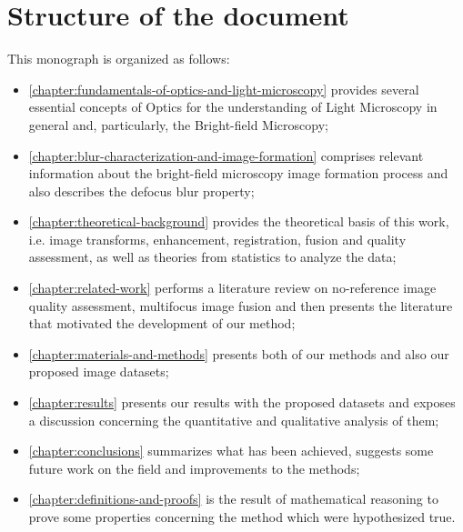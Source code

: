 \section*{Structure of the document}

This monograph is organized as follows:

\begin{itemize}
    \item \autoref{chapter:fundamentals-of-optics-and-light-microscopy} provides several essential concepts of Optics for the understanding of Light Microscopy in general and, particularly, the Bright-field Microscopy;
    
    \item \autoref{chapter:blur-characterization-and-image-formation} comprises relevant information about the bright-field microscopy image formation process and also describes the defocus blur property;
    
    \item \autoref{chapter:theoretical-background} provides the theoretical basis of this work, i.e. image transforms, enhancement, registration, fusion and quality assessment, as well as theories from statistics to analyze the data;
    
    \item \autoref{chapter:related-work} performs a literature review on no-reference image quality assessment, multifocus image fusion and then presents the literature that motivated the development of our method;
    
    \item \autoref{chapter:materials-and-methods} presents both of our methods and also our proposed image datasets;
    
    \item \autoref{chapter:results} presents our results with the proposed datasets and exposes a discussion concerning the quantitative and qualitative analysis of them;
    
    \item \autoref{chapter:conclusions} summarizes what has been achieved, suggests some future work on the field and improvements to the methods;
    
    \item \autoref{chapter:definitions-and-proofs} is the result of mathematical reasoning to prove some properties concerning the method which were hypothesized true.
    
\end{itemize}